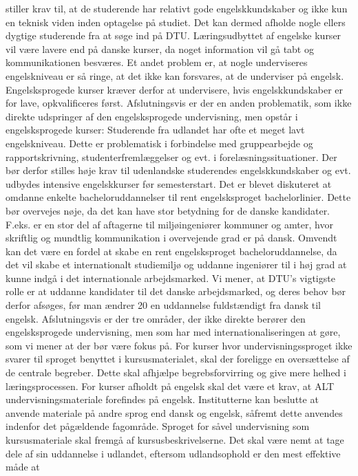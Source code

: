 stiller krav til, at de studerende har relativt gode engelskkundskaber og ikke kun en teknisk viden inden optagelse på
studiet. Det kan dermed afholde nogle ellers dygtige studerende fra at søge ind på DTU. Læringsudbyttet af engelske
kurser vil være lavere end på danske kurser, da noget information vil gå tabt og kommunikationen besværes. Et andet
problem er, at nogle underviseres engelskniveau er så ringe, at det ikke kan forsvares, at de underviser på engelsk.
Engelsksprogede kurser kræver derfor at undervisere, hvis engelskkundskaber er for lave, opkvalificeres først.
Afslutningsvis er der en anden problematik, som ikke direkte udspringer af den engelsksprogede undervisning, men
opstår i engelsksprogede kurser: Studerende fra udlandet har ofte et meget lavt engelskniveau. Dette er problematisk i
forbindelse med gruppearbejde og rapportskrivning, studenterfremlæggelser og evt. i forelæsningssituationer. Der bør
derfor stilles høje krav til udenlandske studerendes engelskkundskaber og evt. udbydes intensive engelskkurser før
semesterstart.
Det er blevet diskuteret at omdanne enkelte bacheloruddannelser til rent engelsksproget bachelorlinier. Dette bør
overvejes nøje, da det kan have stor betydning for de danske kandidater. F.eks. er en stor del af aftagerne til
miljøingeniører kommuner og amter, hvor skriftlig og mundtlig kommunikation i overvejende grad er på dansk.
Omvendt kan det være en fordel at skabe en rent engelsksproget bacheloruddannelse, da det vil skabe et internationalt
studiemiljø og uddanne ingeniører til i høj grad at kunne indgå i det internationale arbejdsmarked. Vi mener, at DTU’s
vigtigste rolle er at uddanne kandidater til det danske arbejdsmarked, og deres behov bør derfor afsøges, før man ændrer
20
en uddannelse fuldstændigt fra dansk til engelsk. Afslutningsvis er der tre områder, der ikke direkte berører den
engelsksprogede undervisning, men som har med internationaliseringen at gøre, som vi mener at der bør være fokus på.
For kurser hvor undervisningssproget ikke svarer til sproget benyttet i kursusmaterialet, skal der foreligge en
oversættelse af de centrale begreber. Dette skal afhjælpe begrebsforvirring og give mere helhed i læringsprocessen. For
kurser afholdt på engelsk skal det være et krav, at ALT undervisningsmateriale forefindes på engelsk. Institutterne kan
beslutte at anvende materiale på andre sprog end dansk og engelsk, såfremt dette anvendes indenfor det pågældende
fagområde. Sproget for såvel undervisning som kursusmateriale skal fremgå af kursusbeskrivelserne.
Det skal være nemt at tage dele af sin uddannelse i udlandet, eftersom udlandsophold er den mest effektive måde at
